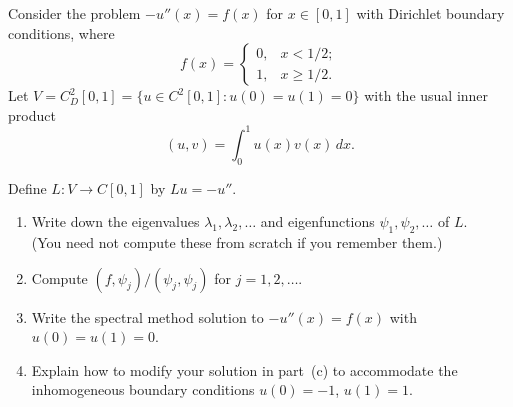 Consider the problem $-u''(x) = f(x)$ for $x\in[0,1]$ with Dirichlet 
boundary conditions, where
\[ f(x) = \left\{\begin{array}{ll}
                  0, & x < 1/2; \\
                  1, & x \ge 1/2.
          \end{array}\right.\]
Let  $V = C^2_D[0,1] = \{ u\in C^2[0,1]: u(0)=u(1)=0\}$ with the usual inner product
\[ (u,v) = \int_0^1 u(x)v(x)\,dx.\]

Define $L: V \to C[0,1]$ by $Lu = -u''$.

\begin{enumerate}
\item Write down the eigenvalues $\lambda_1, \lambda_2, \ldots$ and 
      eigenfunctions $\psi_1, \psi_2, \ldots$ of $L$. \\
      (You need not compute these from scratch if you remember them.)

\vspace*{1em}
\item Compute $(f,\psi_j)/(\psi_j,\psi_j)$ for $j=1, 2, \ldots $. 

\vspace*{1em}
\item Write the spectral method solution to $-u''(x) = f(x)$ with 
      $u(0)=u(1)=0$.

\vspace*{1em}
\item Explain how to modify your solution in part~(c) to accommodate the
      inhomogeneous boundary conditions $u(0)=-1$, $u(1)=1$.
\end{enumerate}


